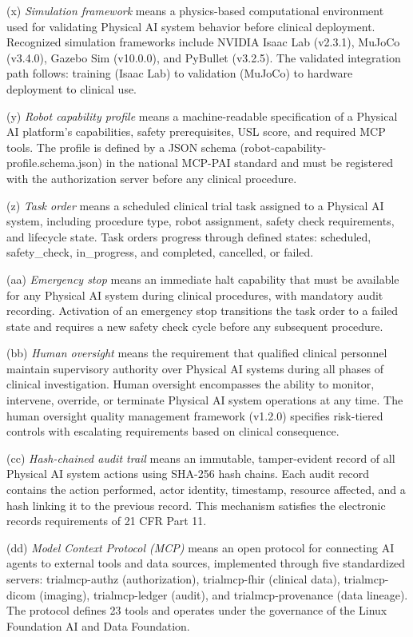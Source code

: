 \documentclass[11pt]{article}
\begin{document}
(x) \textit{Simulation framework} means a physics-based computational environment used for validating Physical AI system behavior before clinical deployment. Recognized simulation frameworks include NVIDIA Isaac Lab (v2.3.1), MuJoCo (v3.4.0), Gazebo Sim (v10.0.0), and PyBullet (v3.2.5). The validated integration path follows: training (Isaac Lab) to validation (MuJoCo) to hardware deployment to clinical use.

(y) \textit{Robot capability profile} means a machine-readable specification of a Physical AI platform's capabilities, safety prerequisites, USL score, and required MCP tools. The profile is defined by a JSON schema (robot-capability-profile.schema.json) in the national MCP-PAI standard and must be registered with the authorization server before any clinical procedure.

(z) \textit{Task order} means a scheduled clinical trial task assigned to a Physical AI system, including procedure type, robot assignment, safety check requirements, and lifecycle state. Task orders progress through defined states: scheduled, safety\_check, in\_progress, and completed, cancelled, or failed.

(aa) \textit{Emergency stop} means an immediate halt capability that must be available for any Physical AI system during clinical procedures, with mandatory audit recording. Activation of an emergency stop transitions the task order to a failed state and requires a new safety check cycle before any subsequent procedure.

(bb) \textit{Human oversight} means the requirement that qualified clinical personnel maintain supervisory authority over Physical AI systems during all phases of clinical investigation. Human oversight encompasses the ability to monitor, intervene, override, or terminate Physical AI system operations at any time. The human oversight quality management framework (v1.2.0) specifies risk-tiered controls with escalating requirements based on clinical consequence.

(cc) \textit{Hash-chained audit trail} means an immutable, tamper-evident record of all Physical AI system actions using SHA-256 hash chains. Each audit record contains the action performed, actor identity, timestamp, resource affected, and a hash linking it to the previous record. This mechanism satisfies the electronic records requirements of 21 CFR Part 11.

(dd) \textit{Model Context Protocol (MCP)} means an open protocol for connecting AI agents to external tools and data sources, implemented through five standardized servers: trialmcp-authz (authorization), trialmcp-fhir (clinical data), trialmcp-dicom (imaging), trialmcp-ledger (audit), and trialmcp-provenance (data lineage). The protocol defines 23 tools and operates under the governance of the Linux Foundation AI and Data Foundation.
\end{document}
